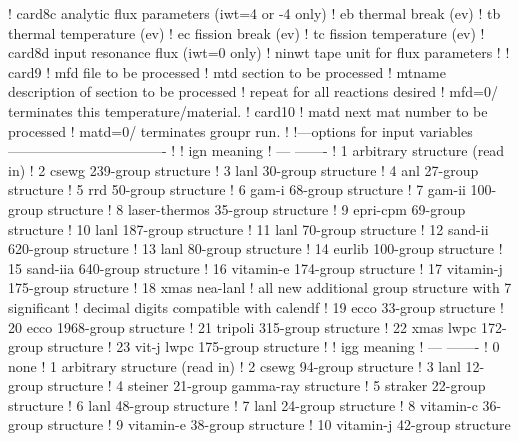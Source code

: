 \begin{ccode}
   ! card8c     analytic flux parameters (iwt=4 or -4 only)
   !    eb      thermal break (ev)
   !    tb      thermal temperature (ev)
   !    ec      fission break (ev)
   !    tc      fission temperature (ev)
   ! card8d     input resonance flux (iwt=0 only)
   !    ninwt   tape unit for flux parameters
   !
   ! card9
   !    mfd     file to be processed
   !    mtd     section to be processed
   !    mtname  description of section to be processed
   !          repeat for all reactions desired
   !          mfd=0/ terminates this temperature/material.
   ! card10
   !    matd    next mat number to be processed
   !            matd=0/ terminates groupr run.
   !
   !---options for input variables----------------------------------
   !
   !     ign          meaning
   !     ---          -------
   !      1           arbitrary structure (read in)
   !      2           csewg 239-group structure
   !      3           lanl 30-group structure
   !      4           anl 27-group structure
   !      5           rrd 50-group structure
   !      6           gam-i 68-group structure
   !      7           gam-ii 100-group structure
   !      8           laser-thermos 35-group structure
   !      9           epri-cpm 69-group structure
   !     10           lanl 187-group structure
   !     11           lanl 70-group structure
   !     12           sand-ii 620-group structure
   !     13           lanl 80-group structure
   !     14           eurlib 100-group structure
   !     15           sand-iia 640-group structure
   !     16           vitamin-e 174-group structure
   !     17           vitamin-j 175-group structure
   !     18           xmas nea-lanl
   !     all new additional group structure with 7 significant
   !     decimal digits compatible with calendf
   !     19           ecco  33-group structure
   !     20           ecco 1968-group structure
   !     21           tripoli 315-group structure
   !     22           xmas lwpc 172-group structure
   !     23           vit-j lwpc 175-group structure
   !
   !     igg          meaning
   !     ---          -------
   !      0           none
   !      1           arbitrary structure (read in)
   !      2           csewg 94-group structure
   !      3           lanl 12-group structure
   !      4           steiner 21-group gamma-ray structure
   !      5           straker 22-group structure
   !      6           lanl 48-group structure
   !      7           lanl 24-group structure
   !      8           vitamin-c 36-group structure
   !      9           vitamin-e 38-group structure
   !     10           vitamin-j 42-group structure

\end{ccode}
